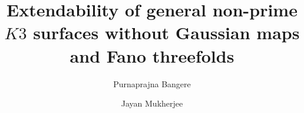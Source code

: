 \documentclass[11pt,twoside]{amsart}
\theoremstyle{plain}
\numberwithin{equation}{section}
\theoremstyle{definition}
\begin{document}
\title[Extendability of $K3$ surfaces without Gaussian maps and Fano threefolds]{Extendability of general non-prime $K3$ surfaces without Gaussian maps and Fano threefolds}


\author[P. Bangere]{Purnaprajna Bangere}
\address{Department of Mathematics, University of Kansas, Lawrence, USA}


\author[J. Mukherjee]{Jayan Mukherjee}
\address{Department of Mathematics, Oklahoma State University, Stillwater, USA}



\end{document}

